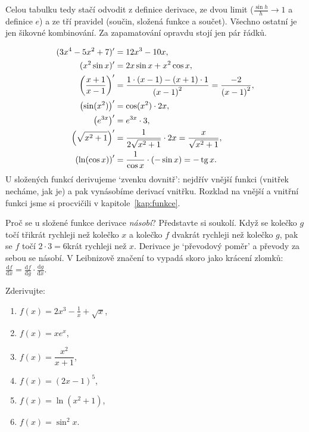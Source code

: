 Celou tabulku tedy stačí odvodit z definice derivace, ze dvou limit ($\frac{\sin h}{h}\to 1$ a definice $e$) a ze tří pravidel (součin, složená funkce a součet). Všechno ostatní je jen šikovné kombinování. Za zapamatování opravdu stojí jen pár řádků.

\begin{example}
  \begin{align*}
    (3x^4 - 5x^2 + 7)' &= 12x^3 - 10x,\\
    (x^2\sin x)' &= 2x\sin x + x^2\cos x,\\
    {\left(\frac{x + 1}{x - 1}\right)}' &= \frac{1\cdot(x - 1) - (x + 1)\cdot 1}{{(x - 1)}^2} = \frac{-2}{{(x - 1)}^2},\\
    \left(\sin(x^2)\right)' &= \cos(x^2)\cdot 2x,\\
    \left(e^{3x}\right)' &= e^{3x}\cdot 3,\\
    \left(\sqrt{x^2 + 1}\right)' &= \frac{1}{2\sqrt{x^2 + 1}}\cdot 2x = \frac{x}{\sqrt{x^2 + 1}},\\
    \left(\ln(\cos x)\right)' &= \frac{1}{\cos x}\cdot(-\sin x) = -\operatorname{tg} x.
  \end{align*}
  U složených funkcí derivujeme `zvenku dovnitř': nejdřív vnější funkci (vnitřek necháme, jak je) a pak vynásobíme derivací vnitřku. Rozklad na vnější a vnitřní funkci jsme si procvičili v kapitole~\ref{kap:funkce}.
\end{example}

Proč se u složené funkce derivace \textit{násobí}? Představte si soukolí. Když se kolečko $g$ točí třikrát rychleji než kolečko $x$ a kolečko $f$ dvakrát rychleji než kolečko $g$, pak se $f$ točí $2\cdot 3 = 6$krát rychleji než $x$. Derivace je `převodový poměr' a převody za sebou se násobí. V Leibnizově značení to vypadá skoro jako krácení zlomků: $\frac{\mathrm{d}f}{\mathrm{d}x} = \frac{\mathrm{d}f}{\mathrm{d}g}\cdot\frac{\mathrm{d}g}{\mathrm{d}x}$.

\begin{problem}
  Zderivujte:
  \begin{enumerate}[label=(\alph*)]
    \item $f(x) = 2x^3 - \frac{1}{x} + \sqrt{x}$,
    \item $f(x) = xe^x$,
    \item $f(x) = \dfrac{x^2}{x + 1}$,
    \item $f(x) = {(2x - 1)}^5$,
    \item $f(x) = \ln(x^2 + 1)$,
    \item $f(x) = \sin^2 x$.
  \end{enumerate}
\end{problem}

